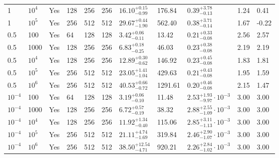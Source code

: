 \documentclass[aps, pre, onecolumn, nofootinbib, notitlepage, groupedaddress, amsfonts, amssymb, amsmath, longbibliography]{revtex4-1}
\begin{document}
\begin{center}
\begin{longtable}{ p{1cm} p{1cm} p{1cm} p{1cm} p{1cm} p{1cm} p{1.75cm} p{1.5cm} p{2.75cm} p{1cm} p{1.2cm}  }
\vspace{0.08cm}1	&	$10^4$	&	Yes	&	128	&	256	&	256	&$	16.10	_{-	0.99	}^{+	0.15	}$&	176.84	&$	0.39	_{-	0.13	}^{+	3.78	}$&	1.24	&	0.41	\\
\vspace{0.08cm}1	&	$10^5$	&	Yes	&	256	&	512	&	512	&$	29.67	_{-	1.90	}^{+	0.44	}$&	562.40	&$	0.38	_{-	0.14	}^{+	3.71	}$&	1.67	&	-0.22	\\
\vspace{0.08cm}0.5	&	100	&	Yes	&	64	&	128	&	128	&$	3.42	_{-	0.11	}^{+	0.06	}$&	13.42	&$	0.21	_{-	0.08	}^{+	0.33	}$&	2.56	&	2.57	\\
\vspace{0.08cm}0.5	&	1000	&	Yes	&	128	&	256	&	256	&$	6.83	_{-	0.25	}^{+	0.18	}$&	46.03	&$	0.23	_{-	0.08	}^{+	0.38	}$&	2.19	&	2.19	\\
\vspace{0.08cm}0.5	&	$10^4$	&	Yes	&	128	&	256	&	256	&$	12.89	_{-	0.62	}^{+	0.30	}$&	146.92	&$	0.23	_{-	0.08	}^{+	0.45	}$&	1.83	&	1.81	\\
\vspace{0.08cm}0.5	&	$10^5$	&	Yes	&	256	&	512	&	512	&$	23.05	_{-	1.04	}^{+	1.41	}$&	429.63	&$	0.21	_{-	0.08	}^{+	0.43	}$&	1.95	&	1.59	\\
\vspace{0.08cm}0.5	&	$10^6$	&	Yes	&	256	&	512	&	512	&$	40.53	_{-	0.72	}^{+	0.66	}$&	1291.61	&$	0.20	_{-	0.08	}^{+	0.46	}$&	2.15	&	1.47	\\
\vspace{0.08cm}$10^{-4}$	&	100	&	Yes	&	64	&	128	&	128	&$	3.19	_{-	0.10	}^{+	0.06	}$&	11.48	&$	2.53	_{-	9.97	}^{+	1.93}\cdot 10^{-3}	$&	3.00	&	3.00	\\
\vspace{0.08cm}$10^{-4}$	&	1000	&	Yes	&	128	&	256	&	256	&$	6.72	_{-	0.19	}^{+	0.57	}$&	38.32	&$	2.88	_{-	1.09	}^{+	2.55}\cdot 10^{-3}	$&	3.00	&	3.00	\\
\vspace{0.08cm}$10^{-4}$	&	$10^4$	&	Yes	&	128	&	256	&	256	&$	11.92	_{-	0.40	}^{+	1.34	}$&	115.06	&$	2.85	_{-	1.13	}^{+	3.11}\cdot 10^{-3}	$&	3.00	&	3.00	\\
\vspace{0.08cm}$10^{-4}$	&	$10^5$	&	Yes	&	256	&	512	&	512	&$	21.11	_{-	1.69	}^{+	4.74	}$&	319.84	&$	2.46	_{-	1.07	}^{+	2.90}\cdot 10^{-3}	$&	3.00	&	3.00	\\
\vspace{0.08cm}$10^{-4}$	&	$10^6$	&	Yes	&	256	&	512	&	512	&$	38.50	_{-	4.71	}^{+	12.54	}$&	920.21	&$	2.26	_{-	1.02	}^{+	2.84}\cdot 10^{-3}	$&	3.00	&	3.00	\\
\hline
\end{longtable}
\end{center}


\end{document}
